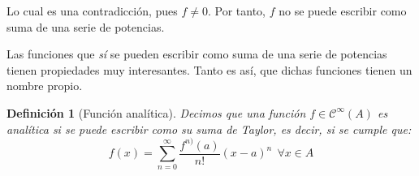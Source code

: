 \documentclass[11pt, a4paper]{article}
\theoremstyle{theorem-style}
\theoremstyle{definition-style}
\newtheorem*{ndef}{Definición}
\theoremstyle{remark-style}
\theoremstyle{example-style}
\begin{document}
Lo cual es una contradicción, pues $f\ne 0$. Por tanto, $f$ no se puede escribir como suma de una serie de potencias.

Las funciones que \textit{sí} se pueden escribir como suma de una serie de potencias tienen propiedades muy interesantes. Tanto es así, que dichas funciones tienen un nombre propio.

\begin{ndef}[Función analítica] Decimos que una función $f \in \mathcal{C}^{\infty}(A)$ es analítica si se puede escribir como su suma de Taylor, es decir, si se cumple que: $$f(x) = \sum_{n=0}^{\infty} \frac{f^{n)}(a)}{n!}(x-a)^n\ \ \forall x \in A$$
\end{ndef}


\end{document}
